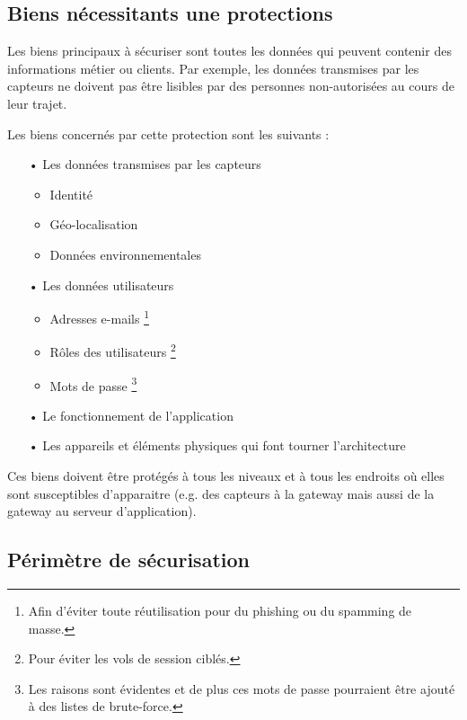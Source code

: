 \newpage
\subsection{Biens nécessitants une protections}

Les biens principaux à sécuriser sont toutes les données qui peuvent contenir des informations métier ou clients. Par exemple, les données transmises par les capteurs ne doivent pas être lisibles par des personnes non-autorisées au cours de leur trajet.

Les biens concernés par cette protection sont les suivants :

\begin{itemize}
\item[•] Les données transmises par les capteurs
\begin{itemize}
\item Identité
\item Géo-localisation
\item Données environnementales
\end{itemize}
\item[•] Les données utilisateurs
\begin{itemize}
\item Adresses e-mails \footnote{Afin d'éviter toute réutilisation pour du phishing ou du spamming de masse.}
\item Rôles des utilisateurs \footnote{Pour éviter les vols de session ciblés.}
\item Mots de passe \footnote{Les raisons sont évidentes et de plus ces mots de passe pourraient être ajouté à des listes de brute-force.}
\end{itemize}
\item[•] Le fonctionnement de l'application
\item[•] Les appareils et éléments physiques qui font tourner l'architecture
\end{itemize}

Ces biens doivent être protégés à tous les niveaux et à tous les endroits où elles sont susceptibles d'apparaitre (e.g. des capteurs à la gateway mais aussi de la gateway au serveur d'application).

\subsection{Périmètre de sécurisation}

